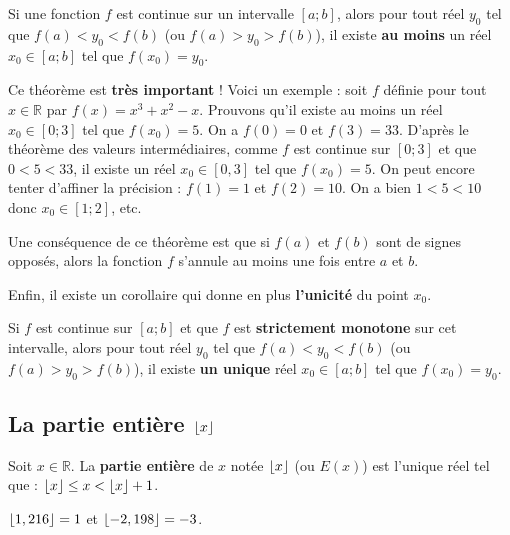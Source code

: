 	\begin{formula}
		Si une fonction $f$ est continue sur un intervalle $[a;b]$, alors pour tout réel $y_0$ tel que $f(a) < y_0 < f(b)$ (ou $f(a) > y_0 > f(b)$), il existe \textbf{au moins} un réel $x_0 \in [a;b]$ tel que $f(x_0) = y_0$.
	\end{formula}
	
	\begin{tip}[Exemple]
		Ce théorème est \textbf{très important} ! Voici un exemple : soit $f$ définie pour tout $x \in \mathbb{R}$ par $f(x) = x^3+x^2-x$. Prouvons qu'il existe au moins un réel $x_0 \in [0;3]$ tel que $f(x_0) = 5$. On a $f(0) = 0$ et $f(3) = 33$. D'après le théorème des valeurs intermédiaires, comme $f$ est continue sur $[0;3]$ et que $0 < 5 < 33$,
		il existe un réel $x_0 \in [0,3]$ tel que $f(x_0) = 5$.
		\newpar
		On peut encore tenter d'affiner la précision : $f(1) = 1$ et $f(2) = 10$. On a bien $1 < 5 < 10$ donc $x_0 \in [1;2]$, etc.
	\end{tip}
	
	\begin{tip}
		Une conséquence de ce théorème est que si $f(a)$ et $f(b)$ sont de signes opposés, alors la fonction $f$ s'annule au moins une fois entre $a$ et $b$.
	\end{tip}
	
	Enfin, il existe un corollaire qui donne en plus \textbf{l'unicité} du point $x_0$.
	
	\begin{formula}[Corollaire]
		Si $f$ est continue sur $[a;b]$ et que $f$ est \textbf{strictement monotone} sur cet intervalle, alors pour tout réel $y_0$ tel que $f(a) < y_0 < f(b)$ (ou $f(a) > y_0 > f(b)$), il existe \textbf{un unique} réel $x_0 \in [a;b]$ tel que $f(x_0) = y_0$.
	\end{formula}
	
	\subsection{La partie entière $\lfloor x \rfloor$}
	
	\begin{formula}[Définition]
		Soit $x \in \mathbb{R}$. La \textbf{partie entière} de $x$ notée $\lfloor x \rfloor$ (ou $E(x)$) est l'unique réel tel que : $\lfloor x \rfloor \leq x < \lfloor x \rfloor + 1$.
	\end{formula}
	
	\begin{tip}[Exemple]
		$\lfloor 1,216 \rfloor = 1$ et $\lfloor -2,198 \rfloor = -3$.
	\end{tip}
	
